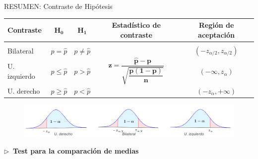 \begin{myblock}{RESUMEN: Contraste de Hipótesis}
\begin{table}[H]
\begin{tabular}{l|c|c|c|c}
\textbf{Contraste} & $\boldsymbol{H_0}$    & $\boldsymbol{H_1}$    & \textbf{Estadístico de contraste}                                                     & \textbf{Región de aceptación}  \\ \hline
                   & \multicolumn{1}{l|}{} & \multicolumn{1}{l|}{} & \multicolumn{1}{l|}{}                                                                 & \multicolumn{1}{l}{}           \\
Bilateral          & $p = \widehat p$      & $p \neq \widehat p$   & \multirow{5}{*}{$\boldsymbol{z=\dfrac{\widehat p - p}{\sqrt{ \dfrac{p (1-p)}{n} }}}$} & $(-z_{\alpha/2},z_{\alpha/2})$ \\ \cline{1-3} \cline{5-5} 
                   & \multicolumn{1}{l|}{} & \multicolumn{1}{l|}{} &                                                                                       &                                \\
U. izquierdo       & $p \le \widehat p$    & $p > \widehat p$      &                                                                                       & $(-\infty,z_\alpha)$           \\ \cline{1-3} \cline{5-5} 
                   & \multicolumn{1}{l|}{} & \multicolumn{1}{l|}{} &                                                                                       &                                \\
U. derecho         & $p \ge \widehat p$    & $p <  \widehat p$     &                                                                                       & $(-z_\alpha,+\infty)$          \\ \hline
\end{tabular}
\end{table}

	\begin{figure}[H]
	\centering
	\includegraphics[width=1\textwidth]{imagenes/imagenes06/T06IM08.png}
	\end{figure}
	
\vspace{1cm}
$\triangleright\ $ \textbf{Test para la comparación de medias}


\end{myblock}
